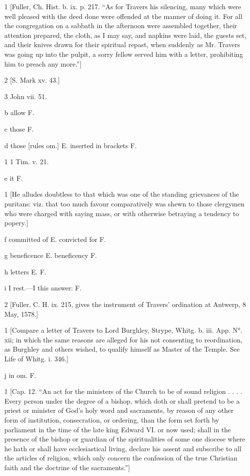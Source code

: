 1
[Fuller, Ch. Hist. b. ix. p. 217. “As for Travers his silencing, many which were well pleased with the deed done were offended at the manner of doing it. For all the congregation on a sabbath in the afternoon were assembled together, their attention prepared, the cloth, as I may say, and napkins were laid, the guests set, and their knives drawn for their spiritual repast, when suddenly as Mr. Travers was going up into the pulpit, a sorry fellow served him with a letter, prohibiting him to preach any more.”]

2
[S. Mark xv. 43.]

3
John vii. 51.

b
allow F.

c
those F.

d
those [rules om.] E. inserted in brackets F.

1
1 Tim. v. 21.

e
it F.

1
[He alludes doubtless to that which was one of the standing grievances of the puritans: viz. that too much favour comparatively was shewn to those clergymen who were charged with saying mass, or with otherwise betraying a tendency to popery.]

f
committed of E. convicted for F.

g
beneficence E. beneficency F.

h
letters E. F.

i
I rest.—I this answer: F.

2
[Fuller, C. H. ix. 215, gives the instrument of Travers’ ordination at Antwerp, 8 May, 1578.]

1
[Compare a letter of Travers to Lord Burghley, Strype, Whitg. b. iii. App. N°. xii; in which the same reasons are alleged for his not consenting to reordination, as Burghley and others wished, to qualify himself as Master of the Temple. See Life of Whitg. i. 346.]

j
in om. F.

1
[Cap. 12. “An act for the ministers of the Church to be of sound religion . . . . Every person under the degree of a bishop, which doth or shall pretend to be a priest or minister of God’s holy word and sacraments, by reason of any other form of institution, consecration, or ordering, than the form set forth by parliament in the time of the late king Edward VI. or now used; shall in the presence of the bishop or guardian of the spiritualities of some one diocese where he hath or shall have ecclesiastical living, declare his assent and subscribe to all the articles of religion, which only concern the confession of the true Christian faith and the doctrine of the sacraments.”]

